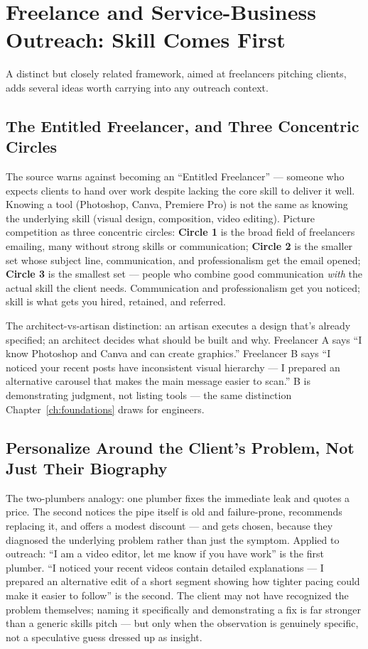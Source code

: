 \section{Freelance and Service-Business Outreach: Skill Comes First}

A distinct but closely related framework, aimed at freelancers pitching clients, adds several ideas worth
carrying into any outreach context.

\subsection{The Entitled Freelancer, and Three Concentric Circles}

The source warns against becoming an ``Entitled Freelancer'' — someone who expects clients to hand over work
despite lacking the core skill to deliver it well. Knowing a tool (Photoshop, Canva, Premiere Pro) is not the
same as knowing the underlying skill (visual design, composition, video editing). Picture competition as three
concentric circles: \textbf{Circle 1} is the broad field of freelancers emailing, many without strong skills or
communication; \textbf{Circle 2} is the smaller set whose subject line, communication, and professionalism get
the email opened; \textbf{Circle 3} is the smallest set — people who combine good communication \emph{with} the
actual skill the client needs. Communication and professionalism get you noticed; skill is what gets you hired,
retained, and referred.

\begin{keytakeaway}
The architect-vs-artisan distinction: an artisan executes a design that's already specified; an architect
decides what should be built and why. Freelancer A says ``I know Photoshop and Canva and can create graphics.''
Freelancer B says ``I noticed your recent posts have inconsistent visual hierarchy — I prepared an alternative
carousel that makes the main message easier to scan.'' B is demonstrating judgment, not listing tools — the same
distinction Chapter~\ref{ch:foundations} draws for engineers.
\end{keytakeaway}

\subsection{Personalize Around the Client's Problem, Not Just Their Biography}

The two-plumbers analogy: one plumber fixes the immediate leak and quotes a price. The second notices the pipe
itself is old and failure-prone, recommends replacing it, and offers a modest discount — and gets chosen, because
they diagnosed the underlying problem rather than just the symptom. Applied to outreach: ``I am a video editor,
let me know if you have work'' is the first plumber. ``I noticed your recent videos contain detailed
explanations — I prepared an alternative edit of a short segment showing how tighter pacing could make it easier
to follow'' is the second. The client may not have recognized the problem themselves; naming it specifically and
demonstrating a fix is far stronger than a generic skills pitch — but only when the observation is genuinely
specific, not a speculative guess dressed up as insight.

